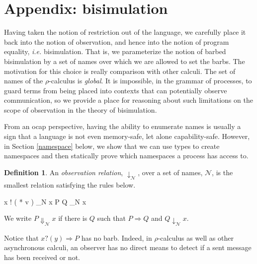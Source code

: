 \documentclass[]{amsart}
\newcommand{\id}[1]{\texttt{#1}}
\newcommand{\juxtap}{\mathbin{\id{|}}}
\newcommand{\concat}{\Rightarrow}
\newcommand{\nameeq}{\mathbin{\equiv_N}}
\newcommand{\binpar}[2]{#1 \juxtap #2}
\newcommand{\outputp}[2]{#1 ! ( * #2 )}
\newcommand{\prefix}[3]{#1 ? ( #2 ) \concat #3}
\newcommand{\wred}{\Rightarrow}
\theoremstyle{definition}
\newtheorem{defn}[thm]{Definition}
\theoremstyle{remark}
\numberwithin{equation}{subsection}
\newcommand{\pic}{$\pi$-calculus}
\newcommand{\rhoc}{$\rho$-calculus}
\begin{document}
\section{Appendix: bisimulation}

Having taken the notion of restriction out of the language, we
carefully place it back into the notion of observation, and hence into
the notion of program equality, {\em i.e.} bisimulation. That is, we
parameterize the notion of barbed bisimulation by a set of names over
which we are allowed to set the barbs. The motivation for this choice
is really comparison with other calculi. The set of names of the
{\rhoc} is \textit{global}. It is impossible, in the grammar of
processes, to guard terms from being placed into contexts that can
potentially observe communication, so we provide a place for
reasoning about such limitations on the scope of observation in the
theory of bisimulation.

From an ocap perspective, having the ability to enumerate names is
usually a sign that a language is not even memory-safe, let alone
capability-safe.  However, in Section \ref{namespace} below, we show
that we can use types to create namespaces and then statically prove
which namespaces a process has access to.


\begin{defn}
An \emph{observation relation}, $\downarrow_{\mathcal N}$, over a set
of names, $\mathcal N$, is the smallest relation satisfying the rules
below.

\infrule[Out-barb]{y \in {\mathcal N}, \; x \nameeq y}
		  {\outputp{x}{v} \downarrow_{\mathcal N} x}
		  {\binpar{P}{Q} \downarrow_{\mathcal N} x}

We write $P \Downarrow_{\mathcal N} x$ if there is $Q$ such that 
$P \wred Q$ and $Q \downarrow_{\mathcal N} x$.
\end{defn}

Notice that $\prefix{x}{y}{P}$ has no barb.  Indeed, in {\rhoc} as well
as other asynchronous calculi, an observer has no direct means to
detect if a sent message has been received or not.
\end{document}
